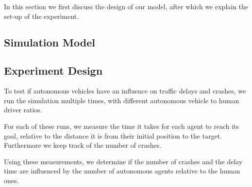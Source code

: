 In this section we first discuss the design of our model, after which we explain the set-up of the experiment.

\subsection{Simulation Model}
\label{sub:method:model}



\subsection{Experiment Design}
\label{sub:method:design}
To test if autonomous vehicles have an influence on traffic delays and crashes, we run the simulation multiple times, with different autonomous vehicle to human driver ratios.

For each of these runs, we measure the time it takes for each agent to reach its goal, relative to the distance it is from their initial position to the target. Furthermore we keep track of the number of crashes. 

Using these measurements, we  determine if the number of crashes and the delay time are influenced by the number of autonomous agents relative to the human ones. 
